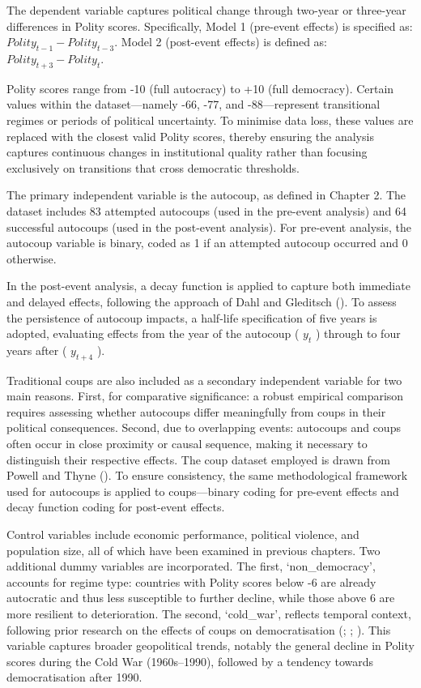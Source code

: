 \documentclass[
  12pt,
]{report}
\begin{document}
The dependent variable captures political change through two-year or
three-year differences in Polity scores. Specifically, Model 1
(pre-event effects) is specified as: \(Polity_{t-1} − Polity_{t − 3}\).
Model 2 (post-event effects) is defined as: \(Polity_{t+3} - Polity_t\).

Polity scores range from -10 (full autocracy) to +10 (full democracy).
Certain values within the dataset---namely -66, -77, and -88---represent
transitional regimes or periods of political uncertainty. To minimise
data loss, these values are replaced with the closest valid Polity
scores, thereby ensuring the analysis captures continuous changes in
institutional quality rather than focusing exclusively on transitions
that cross democratic thresholds.

The primary independent variable is the autocoup, as defined in Chapter
2. The dataset includes 83 attempted autocoups (used in the pre-event
analysis) and 64 successful autocoups (used in the post-event analysis).
For pre-event analysis, the autocoup variable is binary, coded as 1 if
an attempted autocoup occurred and 0 otherwise.

In the post-event analysis, a decay function is applied to capture both
immediate and delayed effects, following the approach of Dahl and
Gleditsch (). To assess the persistence of
autocoup impacts, a half-life specification of five years is adopted,
evaluating effects from the year of the autocoup ( \(y_t\) ) through to
four years after ( \(y_{t+4}\) ).

Traditional coups are also included as a secondary independent variable
for two main reasons. First, for comparative significance: a robust
empirical comparison requires assessing whether autocoups differ
meaningfully from coups in their political consequences. Second, due to
overlapping events: autocoups and coups often occur in close proximity
or causal sequence, making it necessary to distinguish their respective
effects. The coup dataset employed is drawn from Powell and Thyne
(). To ensure consistency, the same
methodological framework used for autocoups is applied to coups---binary
coding for pre-event effects and decay function coding for post-event
effects.

Control variables include economic performance, political violence, and
population size, all of which have been examined in previous chapters.
Two additional dummy variables are incorporated. The first,
`non\_democracy', accounts for regime type: countries with Polity scores
below -6 are already autocratic and thus less susceptible to further
decline, while those above 6 are more resilient to deterioration. The
second, `cold\_war', reflects temporal context, following prior research
on the effects of coups on democratisation (;
;
). This variable
captures broader geopolitical trends, notably the general decline in
Polity scores during the Cold War (1960s--1990), followed by a tendency
towards democratisation after 1990.
\end{document}
